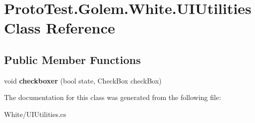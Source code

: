\hypertarget{class_proto_test_1_1_golem_1_1_white_1_1_u_i_utilities}{\section{Proto\-Test.\-Golem.\-White.\-U\-I\-Utilities Class Reference}
\label{class_proto_test_1_1_golem_1_1_white_1_1_u_i_utilities}
}
\subsection*{Public Member Functions}
\begin{DoxyCompactItemize}
\item 
\hypertarget{class_proto_test_1_1_golem_1_1_white_1_1_u_i_utilities_a66ec667ca2e73b84e5326bdb8a7295bd}{void {\bfseries checkboxer} (bool state, Check\-Box check\-Box)}\label{class_proto_test_1_1_golem_1_1_white_1_1_u_i_utilities_a66ec667ca2e73b84e5326bdb8a7295bd}

\end{DoxyCompactItemize}


The documentation for this class was generated from the following file\-:\begin{DoxyCompactItemize}
\item 
White/U\-I\-Utilities.\-cs\end{DoxyCompactItemize}
